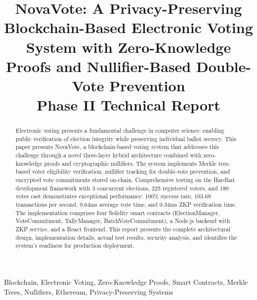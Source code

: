\documentclass[conference]{IEEEtran}
\begin{document}
\title{NovaVote: A Privacy-Preserving Blockchain-Based Electronic Voting System with Zero-Knowledge Proofs and Nullifier-Based Double-Vote Prevention\\
{\large Phase II Technical Report}}

\author{
\and
{}
}

\maketitle

\begin{abstract}
Electronic voting presents a fundamental challenge in computer science: enabling public verification of election integrity while preserving individual ballot secrecy. This paper presents NovaVote, a blockchain-based voting system that addresses this challenge through a novel three-layer hybrid architecture combined with zero-knowledge proofs and cryptographic nullifiers. The system implements Merkle tree-based voter eligibility verification, nullifier tracking for double-vote prevention, and encrypted vote commitments stored on-chain. Comprehensive testing on the Hardhat development framework with 3 concurrent elections, 225 registered voters, and 180 votes cast demonstrates exceptional performance: 100\% success rate, 103.69 transactions per second, 9.64ms average vote time, and 0.34ms ZKP verification time. The implementation comprises four Solidity smart contracts (ElectionManager, VoteCommitment, TallyManager, BatchVoteCommitment), a Node.js backend with ZKP service, and a React frontend. This report presents the complete architectural design, implementation details, actual test results, security analysis, and identifies the system's readiness for production deployment.
\end{abstract}

\begin{IEEEkeywords}
Blockchain, Electronic Voting, Zero-Knowledge Proofs, Smart Contracts, Merkle Trees, Nullifiers, Ethereum, Privacy-Preserving Systems
\end{IEEEkeywords}
\end{document}
